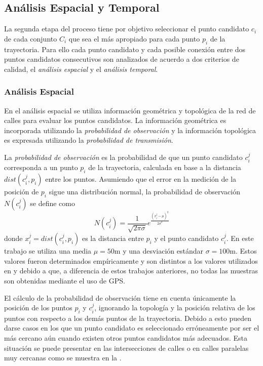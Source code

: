 \subsection{Análisis Espacial y Temporal}

La segunda etapa del proceso tiene por objetivo seleccionar el punto candidato $c_i$ de cada conjunto $C_i$ que sea el más apropiado para cada punto $p_i$ de la trayectoria. Para ello cada punto candidato y cada posible conexión entre dos puntos candidatos consecutivos son analizados de acuerdo a dos criterios de calidad, el \emph{análisis espacial} y el \emph{análisis temporal}.

\subsubsection{Análisis Espacial}

En el análisis espacial se utiliza información geométrica y topológica de la red de calles para evaluar los puntos candidatos. La información geométrica es incorporada utilizando la \emph{probabilidad de observación} y la información topológica es expresada utilizando la \emph{probabilidad de transmisión}.

La \emph{probabilidad de observación} es la probabilidad de que un punto candidato $c_{i}^{j}$ corresponda a un punto $p_i$ de la trayectoria, calculada en base a la distancia $dist(c_{i}^{j},p_i)$ entre los puntos. Asumiendo que el error en la medición de la posición de $p_i$ sigue una distribución normal, la probabilidad de observación $N(c_{i}^{j})$ se define como
\begin{equation} \label{probabilidad_de_observacion}
N(c_{i}^{j}) = \frac {1}{\sqrt { 2 \pi \sigma }} {e}^{\frac {{(x_{i}^{j} - \mu)}^{2}}{{ 2 \sigma}^{2}}}
\end{equation}
donde $x_{i}^{j} = dist(c_{i}^{j},p_i)$ es la distancia entre $p_i$ y el punto candidato $c_{i}^{j}$. En este trabajo se utiliza una media $\mu = 50\text{m}$ y una desviación estándar $\sigma = 100\text{m}$. Estos valores fueron determinados empíricamente y son distintos a los valores utilizados en \cite{lou2009map} y \cite{budigm2012algorithm} debido a que, a diferencia de estos trabajos anteriores, no todas las muestras son obtenidas mediante el uso de GPS.

El cálculo de la probabilidad de observación tiene en cuenta únicamente la posición de los puntos $p_i$ y $c_{i}^{j}$, ignorando la topología y la posición relativa de los puntos con respecto a los demás puntos de la trayectoria. Debido a esto pueden darse casos en los que un punto candidato es seleccionado erróneamente por ser el más cercano aún cuando existen otros puntos candidatos más adecuados. Esta situación se puede presentar en las intersecciones de calles o en calles paralelas muy cercanas como se muestra en la .

